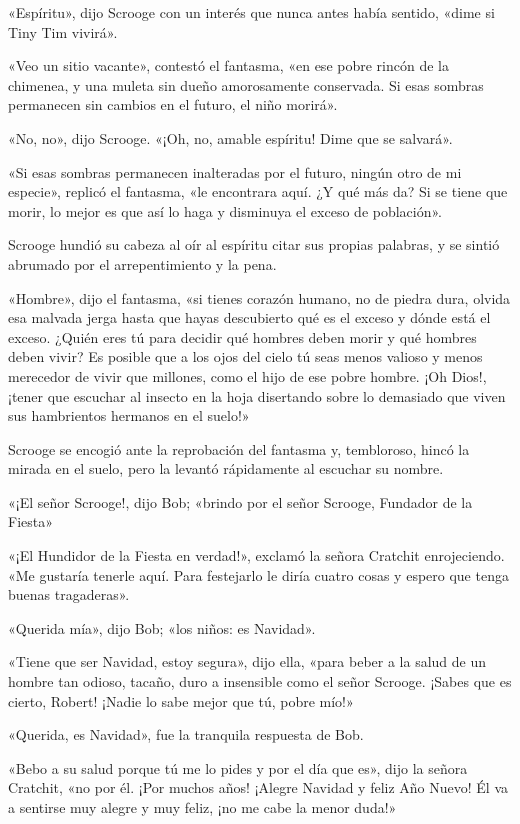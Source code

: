 \documentclass{novela}
\begin{document}
 «Espíritu», dijo Scrooge con un interés que nunca antes había sentido, «dime si Tiny Tim vivirá».

 «Veo un sitio vacante», contestó el fantasma, «en ese pobre rincón de la chimenea, y una muleta sin dueño amorosamente conservada. Si esas sombras permanecen sin cambios en el futuro, el niño morirá».

 «No, no», dijo Scrooge. «¡Oh, no, amable espíritu! Dime que se salvará».

 «Si esas sombras permanecen inalteradas por el futuro, ningún otro de mi especie», replicó el fantasma, «le encontrara aquí. ¿Y qué más da? Si se tiene que morir, lo mejor es que así lo haga y disminuya el exceso de población».

 Scrooge hundió su cabeza al oír al espíritu citar sus propias palabras, y se sintió abrumado por el arrepentimiento y la pena.

 «Hombre», dijo el fantasma, «si tienes corazón humano, no de piedra dura, olvida esa malvada jerga hasta que hayas descubierto qué es el exceso y dónde está el exceso. ¿Quién eres tú para decidir qué hombres deben morir y qué hombres deben vivir? Es posible que a los ojos del cielo tú seas menos valioso y menos merecedor de vivir que millones, como el hijo de ese pobre hombre. ¡Oh Dios!, ¡tener que escuchar al insecto en la hoja disertando sobre lo demasiado que viven sus hambrientos hermanos en el suelo!»

 Scrooge se encogió ante la reprobación del fantasma y, tembloroso, hincó la mirada en el suelo, pero la levantó rápidamente al escuchar su nombre.

 «¡El señor Scrooge!, dijo Bob; «brindo por el señor Scrooge, Fundador de la Fiesta»

 «¡El Hundidor de la Fiesta en verdad!», exclamó la señora Cratchit enrojeciendo. «Me gustaría tenerle aquí. Para festejarlo le diría cuatro cosas y espero que tenga buenas tragaderas».

 «Querida mía», dijo Bob; «los niños: es Navidad».

 «Tiene que ser Navidad, estoy segura», dijo ella, «para beber a la salud de un hombre tan odioso, tacaño, duro a insensible como el señor Scrooge. ¡Sabes que es cierto, Robert! ¡Nadie lo sabe mejor que tú, pobre mío!»

 «Querida, es Navidad», fue la tranquila respuesta de Bob.

 «Bebo a su salud porque tú me lo pides y por el día que es», dijo la señora Cratchit, «no por él. ¡Por muchos años! ¡Alegre Navidad y feliz Año Nuevo! Él va a sentirse muy alegre y muy feliz, ¡no me cabe la menor duda!»
\end{document}
